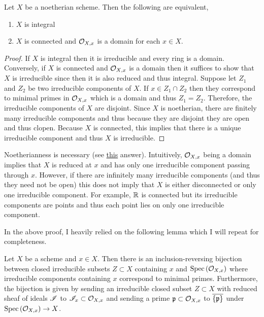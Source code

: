 \documentclass[12pt]{article}
\begin{document}
\begin{lemma}
Let $X$ be a noetherian scheme. Then the following are equivalent,
\begin{enumerate}
\item $X$ is integral
\item $X$ is connected and $\mathcal{O}_{X, x}$ is a domain for each $x \in X$.
\end{enumerate}
\end{lemma}

\begin{proof}
If $X$ is integral then it is irreducible and every ring is a domain. Conversely, if $X$ is connected and $\mathcal{O}_{X, x}$ is a domain then it suffices to show that $X$ is irreducible since then it is also reduced and thus integral. Suppose let $Z_1$ and $Z_2$ be two irreducible components of $X$. If $x \in Z_1 \cap Z_2$ then they correspond to minimal primes in $\mathcal{O}_{X, x}$ which is a domain and thus $Z_1 = Z_2$. Therefore, the irreducible components of $X$ are disjoint. Since $X$ is noetherian, there are finitely many irreducible components and thus because they are disjoint they are open and thus clopen. Because $X$ is connected, this implies that there is a unique irreducible component and thus $X$ is irreducible.
\end{proof}

\begin{rmk}
Noetherianness is necessary (see \href{https://mathoverflow.net/questions/7477/non-integral-scheme-having-integral-local-rings}{this} answer). Intuitively, $\mathcal{O}_{X, x}$ being a domain implies that $X$ is reduced at $x$ and has only one irreducible component passing through $x$. However, if there are infinitely many irreducible components (and thus they need not be open) this does not imply that $X$ is either disconnected or only one irreducible component. For example, $\mathbb{R}$ is connected but its irreducible components are points and thus each point lies on only one irreducible component.
\end{rmk}

\begin{rmk}
In the above proof, I heavily relied on the following lemma which I will repeat for completeness.
\end{rmk}

\begin{lemma}
Let $X$ be a scheme and $x \in X$. Then there is an inclusion-reversing bijection between closed irreducible subsets $Z \subset X$ containing $x$ and $\mathrm{Spec}\left( \mathcal{O}_{X, x} \right)$ where irreducible components containing $x$ correspond to minimal primes. Furthermore, the bijection is given by sending an irreducible closed subset $Z \subset X$ with reduced sheaf of ideals $\mathscr{I}$ to $\mathscr{I}_x \subset \mathcal{O}_{X, x}$ and sending a prime $\mathfrak{p} \subset \mathcal{O}_{X, x}$ to $\overline{ \{ \mathfrak{p} \} }$ under $\mathrm{Spec}\left( \mathcal{O}_{X, x} \right) \to X$.
\end{lemma}
\end{document}
